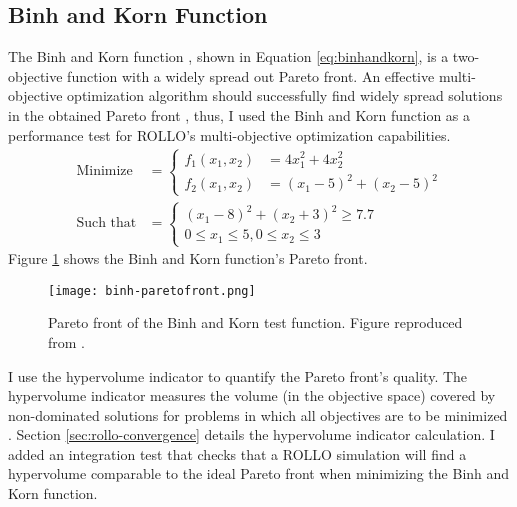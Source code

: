 \subsection{Binh and Korn Function}
\label{sec:binhandkorn}
The Binh and Korn function \cite{binh_mobes_1997}, shown in Equation 
\ref{eq:binhandkorn}, is a two-objective function with a widely spread out Pareto 
front. 
An effective multi-objective optimization algorithm should successfully find widely 
spread solutions in the obtained Pareto front \cite{deb_multi-objective_2001}, 
thus, I used the Binh and Korn function as a performance test for \gls{ROLLO}'s 
multi-objective optimization capabilities.
\begin{align}
    \label{eq:binhandkorn}
    \mbox{Minimize} &= \begin{cases}
        f_1 (x_1,x_2) &= 4x_1^2+4x_2^2 \\
        f_2 (x_1,x_2) &= (x_1-5)^2 + (x_2-5)^2 
    \end{cases} \\
    \mbox{Such that} &= \begin{cases}
        (x_1-8)^2 + (x_2+3)^2 \geq 7.7 \nonumber \\
        0 \leq x_1 \leq 5, 0 \leq x_2 \leq 3 \nonumber
    \end{cases}
\end{align}
Figure \ref{fig:binh_paretofront} shows the Binh and Korn function's Pareto front.
\begin{figure}[htbp]
    \centering
    \texttt{[image: binh-paretofront.png]} 
    \caption{Pareto front of the Binh and Korn test function. Figure reproduced from 
    \cite{bassi_statistics_2018}. }
    \label{fig:binh_paretofront}
\end{figure}
I use the hypervolume indicator to quantify the Pareto front's quality. 
The hypervolume indicator measures the volume (in the objective space) covered by 
non-dominated solutions for problems in which all objectives are to be 
minimized \cite{deb_multi-objective_2001}.  
Section \ref{sec:rollo-convergence} details the hypervolume indicator calculation.
I added an integration test that checks that a ROLLO simulation will 
find a hypervolume comparable to the ideal Pareto front when minimizing the
Binh and Korn function. 

